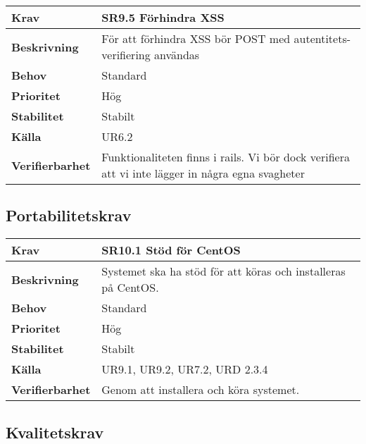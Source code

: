 \documentclass[a4paper, twoside, 11pt, titlepage]{article}
\begin{document}
	\begin {table} [ht] \begin{tabular} { p{2.6cm} p{12.5cm} }
		\hline
		\sffamily\textbf{Krav} & \sffamily\textbf{SR9.5 Förhindra XSS  } \\
		\hline
		\sffamily\textbf{Beskrivning} & För att förhindra XSS bör POST med autentitets-verifiering användas  \\
		\hline
		\sffamily\textbf{Behov} & Standard  \\
		\hline
		\sffamily\textbf{Prioritet} & Hög  \\
		\hline
		\sffamily\textbf{Stabilitet} & Stabilt  \\
		\hline
		\sffamily\textbf{Källa} & UR6.2  \\
		\hline
		\sffamily\textbf{Verifierbarhet} & Funktionaliteten finns i rails. Vi bör dock verifiera att vi inte lägger in några egna svagheter  \\
		\hline
	\end{tabular} \end{table} \FloatBarrier


	\subsection{Portabilitetskrav}


	\begin {table} [ht] \begin{tabular} { p{2.6cm} p{12.5cm} }
		\hline
		\sffamily\textbf{Krav} & \sffamily\textbf{SR10.1 Stöd för CentOS } \\
		\hline
		\sffamily\textbf{Beskrivning} & Systemet ska ha stöd för att köras och installeras på CentOS.  \\
		\hline
		\sffamily\textbf{Behov} & Standard  \\
		\hline
		\sffamily\textbf{Prioritet} & Hög  \\
		\hline
		\sffamily\textbf{Stabilitet} & Stabilt  \\
		\hline
		\sffamily\textbf{Källa} & UR9.1, UR9.2, UR7.2, URD 2.3.4  \\
		\hline
		\sffamily\textbf{Verifierbarhet} & Genom att installera och köra systemet.  \\
		\hline
	\end{tabular} \end{table} \FloatBarrier


	\subsection{Kvalitetskrav}
\end{document}
